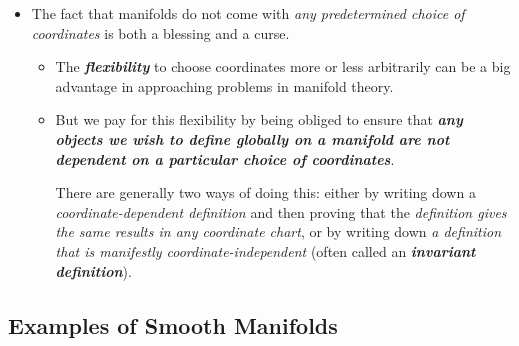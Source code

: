 \documentclass[11pt]{article}
\begin{document}
\begin{itemize}
\item The fact that manifolds do not come with \emph{any predetermined choice of coordinates} is both a blessing and a curse.
\begin{itemize}
\item The \emph{\textbf{flexibility}} to choose coordinates more or less arbitrarily can be a big advantage in approaching problems in manifold theory.
\item But we pay for this flexibility by being obliged to ensure that \emph{\textbf{any objects we wish to define globally on a manifold are not dependent on a particular choice of coordinates}}.

There are generally two ways of doing this: either by writing down a \emph{coordinate-dependent definition} and then proving that the \emph{definition gives the same results in any coordinate chart}, or by writing down \emph{a definition that is manifestly coordinate-independent} (often called an \emph{\textbf{invariant definition}}).
\end{itemize}
\end{itemize}

\subsection{Examples of Smooth Manifolds}
\end{document}
